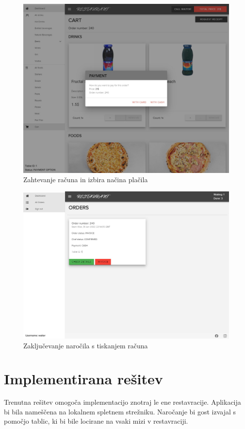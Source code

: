 \documentclass[a4paper, 12pt]{book}
\begin{document}
\begin{figure}
\centering
\includegraphics[width=11.5cm]{order_10.jpg}
\caption{Zahtevanje računa in izbira načina plačila}
\label{Opis6}
\end{figure}
\begin{figure}
\centering
\includegraphics[width=11.5cm]{order_11.jpg}
\caption{Zaključevanje naročila s tiskanjem računa}
\label{Opis66}
\end{figure}


\clearpage
\section{Implementirana rešitev}
Trenutna rešitev omogoča implementacijo znotraj le ene restavracije. Aplikacija bi bila nameščena na lokalnem spletnem strežniku. Naročanje bi gost izvajal s pomočjo tablic, ki bi bile locirane na vsaki mizi v restavraciji. 
\end{document}
